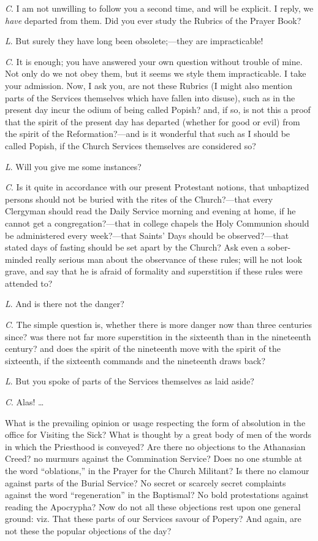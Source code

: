 \emph{C}. I am not unwilling to follow you a
second time, and will be explicit. I reply, we \emph{have} departed
from them. Did you ever study the Rubrics of the Prayer Book?

\emph{L}. But surely they have long been
obsolete;—they are impracticable!

\emph{C}. It is enough; you have answered your
own question without trouble of mine. Not only do we not obey them,
but it seems we style them impracticable. I take your admission. Now,
I ask you, are not these Rubrics (I might also mention parts of the
Services themselves which have fallen into disuse), such as in the
present day incur the odium of being called Popish? and, if so, is not
this a proof that the spirit of the present day has departed (whether
for good or evil) from the spirit of the Reformation?—and is it
wonderful that such as I should be called Popish, if the Church
Services themselves are considered so?

\emph{L}. Will you give me some instances?

\emph{C}. Is it quite in accordance with our
present Protestant notions, that unbaptized persons should not be
buried with the rites of the Church?—that every Clergyman should
read the Daily Service morning and evening at home, if he cannot get a
congregation?—that in college chapels the Holy Communion should be
administered every week?—that Saints' Days should be
observed?—that stated days of fasting should be set apart by the
Church? Ask even a sober-minded really serious man about the
observance of these rules; will he not look grave, and say that he is afraid of formality and superstition if these rules were
attended to?

\emph{L}. And is there not the danger?

\emph{C}. The simple question is, whether there
is more danger now than three centuries since? was there not far more
superstition in the sixteenth than in the nineteenth century? and does
the spirit of the nineteenth move with the spirit of the sixteenth, if
the sixteenth commands and the nineteenth draws back?

\emph{L}. But you spoke of parts of the Services
themselves as laid aside?

\emph{C}. Alas! …

What is the prevailing opinion or usage respecting the form of
absolution in the office for Visiting the Sick? What is thought by a
great body of men of the words in which the Priesthood is conveyed?
Are there no objections to the Athanasian Creed? no murmurs against
the Commination Service? Does no one stumble at the word ``oblations,''
in the Prayer for the Church Militant? Is there no clamour against
parts of the Burial Service? No secret or scarcely secret complaints
against the word ``regeneration'' in the Baptismal? No bold
protestations against reading the Apocrypha? Now do not all these
objections rest upon one general ground: viz. That these parts of our
Services savour of Popery? And again, are not these the popular
objections of the day?


